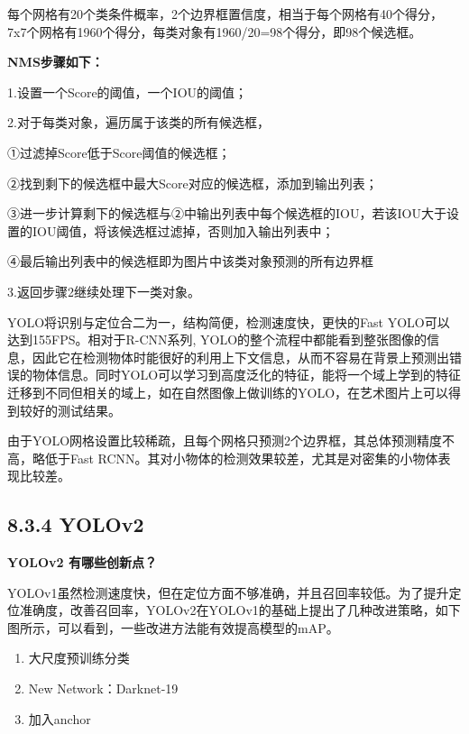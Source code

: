 \begin{figure}
\centering
\caption{}
\end{figure}

每个网格有20个类条件概率，2个边界框置信度，相当于每个网格有40个得分，7x7个网格有1960个得分，每类对象有1960/20=98个得分，即98个候选框。

\textbf{NMS步骤如下：}

1.设置一个Score的阈值，一个IOU的阈值；

2.对于每类对象，遍历属于该类的所有候选框，

①过滤掉Score低于Score阈值的候选框；

②找到剩下的候选框中最大Score对应的候选框，添加到输出列表；

③进一步计算剩下的候选框与②中输出列表中每个候选框的IOU，若该IOU大于设置的IOU阈值，将该候选框过滤掉，否则加入输出列表中；

④最后输出列表中的候选框即为图片中该类对象预测的所有边界框

3.返回步骤2继续处理下一类对象。

YOLO将识别与定位合二为一，结构简便，检测速度快，更快的Fast
YOLO可以达到155FPS。相对于R-CNN系列,
YOLO的整个流程中都能看到整张图像的信息，因此它在检测物体时能很好的利用上下文信息，从而不容易在背景上预测出错误的物体信息。同时YOLO可以学习到高度泛化的特征，能将一个域上学到的特征迁移到不同但相关的域上，如在自然图像上做训练的YOLO，在艺术图片上可以得到较好的测试结果。

由于YOLO网格设置比较稀疏，且每个网格只预测2个边界框，其总体预测精度不高，略低于Fast
RCNN。其对小物体的检测效果较差，尤其是对密集的小物体表现比较差。

\subsection{8.3.4 YOLOv2}\label{yolov2}

\textbf{YOLOv2 有哪些创新点？}

YOLOv1虽然检测速度快，但在定位方面不够准确，并且召回率较低。为了提升定位准确度，改善召回率，YOLOv2在YOLOv1的基础上提出了几种改进策略，如下图所示，可以看到，一些改进方法能有效提高模型的mAP。

\begin{enumerate}
\def\labelenumi{\arabic{enumi}.}
\item
  大尺度预训练分类
\item
  New Network：Darknet-19
\item
  加入anchor
\end{enumerate}

